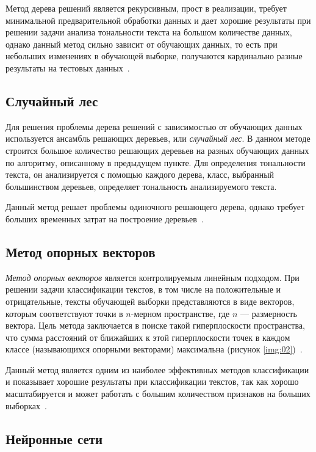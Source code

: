 Метод дерева решений является рекурсивным, прост в реализации, требует
минимальной предварительной обработки данных и дает хорошие результаты при
решении задачи анализа тональности текста на большом количестве данных, однако
данный метод сильно зависит от обучающих данных, то есть при небольших
изменениях в обучающей выборке, получаются кардинально разные результаты на
тестовых данных~\cite{article05}.

\subsection{Случайный лес}

Для решения проблемы дерева решений с зависимостью от обучающих данных
используется ансамбль решающих деревьев, или \textit{случайный лес}.
В данном методе строится большое количество решающих деревьев на разных
обучающих данных по алгоритму, описанному в предыдущем пункте. Для определения
тональности текста, он анализируется с помощью каждого дерева, класс, выбранный
большинством деревьев, определяет тональность анализируемого текста.

Данный метод решает проблемы одиночного решающего дерева, однако требует больших
временных затрат на построение деревьев~\cite{article05}.

\subsection{Метод опорных векторов}

\textit{Метод опорных векторов} является контролируемым линейным подходом. При
решении задачи классификации текстов, в том числе на положительные и
отрицательные, тексты обучающей выборки представляются в виде векторов, которым
соответствуют точки в $n$-мерном пространстве, где $n$ --- размерность вектора.
Цель метода заключается в поиске такой гиперплоскости пространства, что сумма
расстояний от ближайших к этой гиперплоскости точек в каждом классе
(называющихся опорными векторами) максимальна (рисунок
\ref{img:02})~\cite{article16}.


Данный метод является одним из наиболее эффективных методов классификации
и показывает хорошие результаты при классификации текстов, так как
хорошо масштабируется и может работать с большим количеством признаков на
больших выборках~\cite{article05}.

\subsection{Нейронные сети}

